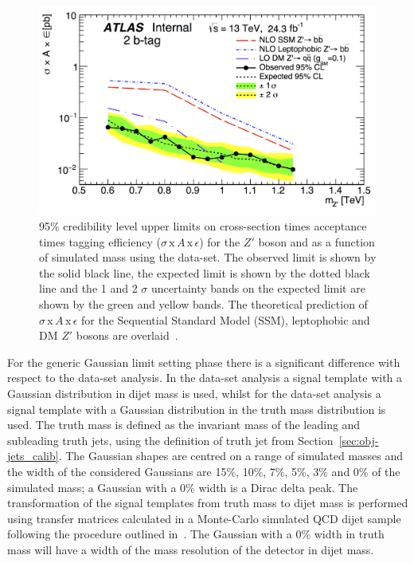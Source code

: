 \begin{figure}[!t]
  \centering
  \includegraphics[width=0.9\linewidth, angle=0]{figs/Dibjet/LowMass/lim-lowmass_zprime_mjjcut.png}
  \caption[95\% credibility level upper limits on
           cross-section times acceptance times tagging efficiency
           ($\sigma\,\text{x}\,\mathit{A}\,\text{x}\,\epsilon$)
           for the $Z'$ boson and as a function of simulated mass using the \lm{} data-set.]
          {95\% credibility level upper limits on cross-section times acceptance times tagging efficiency
            ($\sigma\,\text{x}\,\mathit{A}\,\text{x}\,\epsilon$)
             for the $Z'$ boson and as a function of simulated mass using the \lm{} data-set.
             The observed limit is shown by the solid black line, the expected limit is shown by the dotted black line
             and the 1 and 2 $\sigma$ uncertainty bands on the expected limit are shown by the green and yellow bands.
             The theoretical prediction of $\sigma\,\text{x}\,\mathit{A}\,\text{x}\,\epsilon$
             for the Sequential Standard Model (SSM), leptophobic and DM $Z'$ bosons are overlaid~\cite{dibjet-full_int}.}
  \label{fig:lim-lowmass_benchmark}
\end{figure}

For the generic Gaussian limit setting phase there is a significant difference
with respect to the \summer{} data-set analysis.
In the \summer{} data-set analysis a signal template with a Gaussian distribution in dijet mass is used,
whilst for the \lm{} data-set analysis a signal template with a Gaussian distribution in the truth mass distribution is used.
The truth mass is defined as the invariant mass of the leading and subleading truth jets,
using the definition of truth jet from Section~\ref{sec:obj-jets_calib}.
The Gaussian shapes are centred on a range of simulated masses and the width of the considered Gaussians are
15\%, 10\%, 7\%, 5\%, 3\% and 0\% of the simulated mass;
a Gaussian with a 0\% width is a Dirac delta peak.
The transformation of the signal templates from truth mass to dijet mass is performed using
transfer matrices calculated in a Monte-Carlo simulated QCD dijet sample
following the procedure outlined in~\cite{dijet-mori17_paper}.
The Gaussian with a 0\% width in truth mass will have
a width of the mass resolution of the detector in dijet mass.

